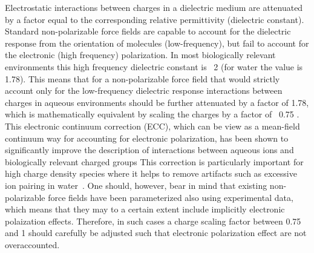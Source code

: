 \documentclass[journal=jctcce,manuscript=article]{achemso}
\begin{document}

Electrostatic interactions between charges in a dielectric medium are attenuated by a factor equal to the
corresponding relative permittivity (dielectric constant). Standard non-polarizable force fields are capable to
account for the dielectric response from the orientation of molecules (low-frequency), but fail to account for the electronic (high frequency) polarization.
In most biologically relevant environments this high frequency dielectric constant is ~2 (for water the value is 1.78).
This means that for a non-polarizable force field that would strictly account only for the low-frequency dielectric response
interactions between charges in aqueous environments should be further attenuated by a factor of 1.78, which is mathematically
equivalent by scaling the charges by a factor of ~0.75 \cite{leontyev09,leontyev14}. 
This electronic continuum correction (ECC), which can be view as a mean-field continuum way for accounting for electronic polarization,
has been shown to significantly improve the description of interactions between aqueous ions and biologically relevant charged groups \cite{pluharova13,kohagen14,kohagen14b,melcr18,xie16,kroutil17,bruce18}
This correction is particularly important for high charge density species where it helps to remove artifacts such as excessive ion pairing in water~\cite{pluharova13,vazdar13}.
One should, however, bear in mind that existing non-polarizable force fields have been parameterized also using experimental data, which means that they may to a certain extent include implicitly electronic polaization effects. Therefore, in such cases a charge scaling factor between 0.75 and 1 should carefully be adjusted such that electronic polarization effect are not overaccounted.    
\end{document}

